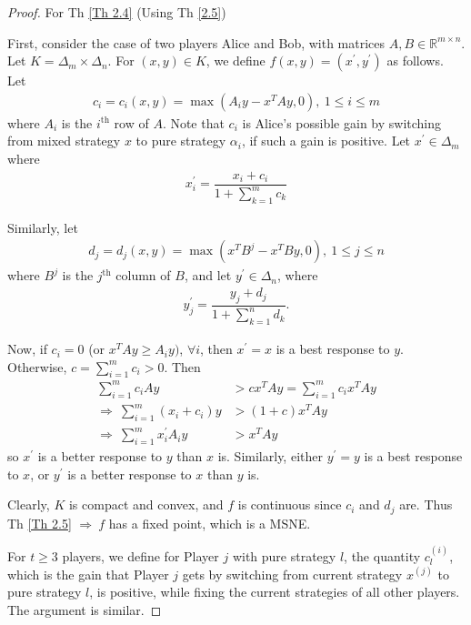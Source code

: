 \begin{proof}
    For Th \ref{Th 2.4} (Using Th \ref{2.5})

   First, consider the case of two players Alice and Bob, with matrices $A, B\in\mathbb{R}^{m\times n}$. Let $K = \Delta_m\times \Delta_n$. For $(x, y)\in K$, we define $f(x, y) = (x^{\prime}, y^{\prime})$ as follows. Let
   \begin{align*}
       c_i = c_i(x, y) = \max\left(A_i y - x^T Ay, 0 \right), \ 1\leqslant i\leqslant m
   \end{align*}
    where $A_i$ is the $i^{\text{th}}$ row of $A$. Note that $c_i$ is Alice's possible gain by switching from mixed strategy $x$ to pure strategy $\alpha_i$, if such a gain is positive. Let $x^{\prime}\in\Delta_m$ where 
    \begin{align*}
        x_i^{\prime} = \dfrac{x_i + c_i}{1+\sum\limits_{k=1}^m c_k}
    \end{align*}

    Similarly, let
    \begin{align*}
        d_j = d_j(x, y) = \max\left( x^T B^j - x^T B y, 0\right), \ 1\leqslant j\leqslant n
    \end{align*}
    where $B^j$ is the $j^{\text{th}}$ column of $B$, and let $y^{\prime}\in \Delta_n$, where
    \begin{align*}
        y_j^{\prime} = \dfrac{y_j+d_j}{1+ \sum\limits_{k=1}^n d_k}.
    \end{align*}

    Now, if $c_i = 0$ (or $x^TAy\geqslant A_iy)$, $\forall i$, then $x^{\prime} = x$ is a best response to $y$. Otherwise, $c = \sum\limits_{i=1}^m c_i >0$. Then 
    \begin{align*}
        \sum\limits_{i=1}^m c_i A y &> cx^TAy = \sum\limits_{i=1}^m c_ix^TAy \\
        \Longrightarrow \ \sum\limits_{i=1}^m (x_i+c_i) y &> (1+c)x^TAy \\
        \Longrightarrow \ \sum\limits_{i=1}^m x_i^{\prime} A_i y &> x^TAy
    \end{align*}
   so $x^{\prime}$ is a better response to $y$ than $x$ is. Similarly, either $y^{\prime} = y$ is a best response to $x$, or $y^{\prime}$ is a better response to $x$ than $y$ is.

   Clearly, $K$ is compact and convex, and $f$ is continuous since $c_i$ and $d_j$ are. Thus Th \ref{Th 2.5} $\Longrightarrow \ f$ has a fixed point, which is a MSNE.

   For $t\geqslant 3$ players, we define for Player $j$ with pure strategy $l$, the quantity $c_l^{(i)}$, which is the gain that Player $j$ gets by switching from current strategy $x^{(j)}$ to pure strategy $l$, is positive, while fixing the current strategies of all other players. The argument is similar.
\end{proof}


